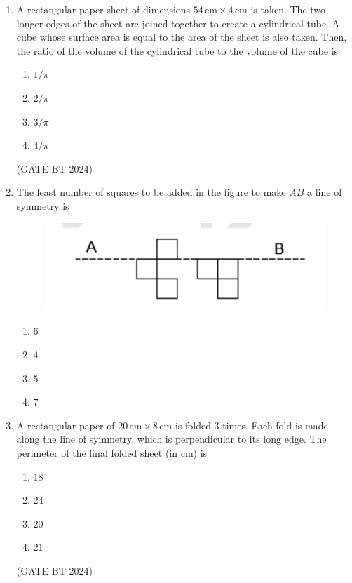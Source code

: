 \documentclass[journal,12pt,onecolumn]{IEEEtran}
\theoremstyle{remark}
\begin{document}
\begin{enumerate}
\item 
A rectangular paper sheet of dimensions $54\,\text{cm} \times 4\,\text{cm}$ is taken. The two longer edges of the sheet are joined together to create a cylindrical tube. A cube whose surface area is equal to the area of the sheet is also taken. Then, the ratio of the volume of the cylindrical tube to the volume of the cube is
\begin{multicols}{2}
\begin{enumerate}
    \item $1/\pi$
    \item $2/\pi$
    \item $3/\pi$
    \item $4/\pi$
\end{enumerate}
\end{multicols}
\hfill(GATE BT 2024)

\item The least number of squares to be added in the figure to make $AB$ a line of symmetry is

\begin{figure}
\includegraphics[width=\columnwidth]{figs/figure_path.png}
\label{fig:figure_path}
\end{figure}
\begin{multicols}{2}
\begin{enumerate}
    \item $6$
    \item $4$
    \item $5$
    \item $7$
\end{enumerate}
\end{multicols}

\item 
A rectangular paper of $20\,\text{cm} \times 8\,\text{cm}$ is folded $3$ times. Each fold is made along the line of symmetry, which is perpendicular to its long edge. The perimeter of the final folded sheet (in cm) is

\begin{enumerate}
    \item $18$
    \item $24$
    \item $20$
    \item $21$
\end{enumerate}
\hfill(GATE BT 2024)


\end{enumerate}
\end{document}

